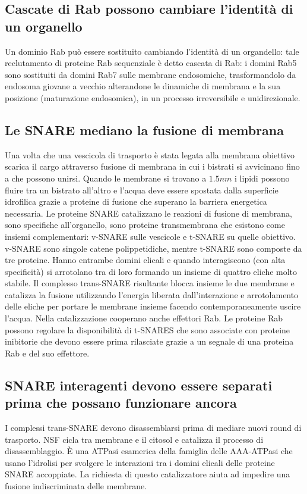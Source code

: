 \subsection{Cascate di Rab possono cambiare l'identit\`a di un organello}
Un dominio Rab pu\`o essere sostituito cambiando l'identit\`a di un organdello: tale reclutamento di proteine Rab sequenziale \`e detto cascata di Rab: i domini Rab5 sono sostituiti
da domini Rab7 sulle membrane endosomiche, trasformandolo da endosoma giovane a vecchio alterandone le dinamiche di membrana e la sua posizione (maturazione endosomica), in un processo
irreversibile e unidirezionale.
\subsection{Le SNARE mediano la fusione di membrana}
Una volta che una vescicola di trasporto \`e stata legata alla membrana obiettivo scarica il cargo attraverso fusione di membrana in cui i bistrati si avvicinano fino a che possono
unirsi. Quando le membrane si trovano a $1.5nm$ i lipidi possono fluire tra un bistrato all'altro e l'acqua deve essere spostata dalla superficie idrofilica grazie a proteine di
fusione che superano la barriera energetica necessaria. Le proteine SNARE catalizzano le reazioni di fusione di membrana, sono specifiche all'organello, sono proteine transmembrana che
esistono come insiemi complementari: v-SNARE sulle vescicole e t-SNARE su quelle obiettivo. v-SNARE sono singole catene polippetidiche, mentre t-SNARE sono composte da tre proteine.
Hanno entrambe domini elicali e quando interagiscono (con alta specificit\`a) si arrotolano tra di loro formando un insieme di quattro eliche molto stabile. Il complesso trans-SNARE 
risultante blocca insieme le due membrane e catalizza la fusione utilizzando l'energia liberata dall'interazione e arrotolamento delle eliche per portare le membrane insieme facendo
contemporaneamente uscire l'acqua. Nella catalizzazione cooperano anche effettori Rab. Le proteine Rab possono regolare la disponibilit\`a di t-SNARES che sono associate con
proteine inibitorie che devono essere prima rilasciate grazie a un segnale di una proteina Rab e del suo effettore. 
\subsection{SNARE interagenti devono essere separati prima che possano funzionare ancora}
I complessi trans-SNARE devono disassemblarsi prima di mediare nuovi round di trasporto. NSF cicla tra membrane e il citosol e catalizza il processo di disassemblaggio. \`E una ATPasi
esamerica della famiglia delle AAA-ATPasi che usano l'idrolisi per svolgere le interazioni tra i domini elicali delle proteine SNARE accoppiate. La richiesta di questo catalizzatore
aiuta ad impedire una fusione indiscriminata delle membrane. 
